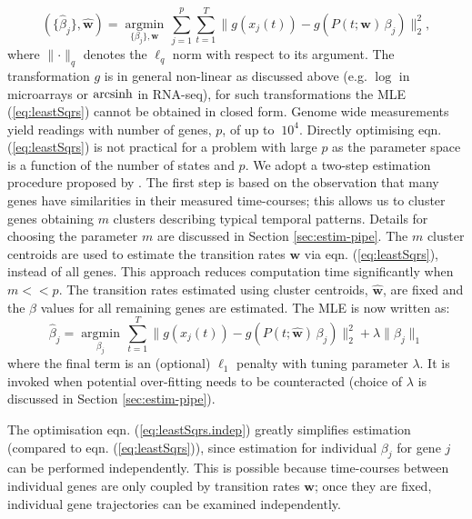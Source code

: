 \begin{equation}
  \label{eq:leastSqrs}
  (\lbrace\hat{\beta}_j\rbrace, \hat{\mathbf{w}}) =  \underset{\lbrace\beta_j\rbrace, \mathbf{w}}{\operatorname{argmin}} \, \sum_{j=1}^p \sum_{t=1}^T \lVert g(x_j(t)) - g\left(P(t; \mathbf{w})\,\beta_j \right) \rVert_2^2,%
\end{equation}
where $\lVert \cdot \rVert_q$ denotes the $\ell_q$ norm with respect to its argument.
The transformation $g$ is in general non-linear as discussed above (e.g. $\log$ in microarrays or $\operatorname{arcsinh}$ in RNA-seq), for such transformations the MLE (\ref{eq:leastSqrs}) cannot be obtained in closed form. Genome wide measurements yield readings with number of genes, $p$, of up to $~10^4$. Directly optimising eqn. (\ref{eq:leastSqrs}) is not practical for a problem with large $p$ as the parameter space is a function of the number of states and $p$. We adopt a two-step estimation procedure proposed by \cite{Armond:2013}. The first step is based on the observation that many genes have similarities in their measured time-courses; this allows us to cluster genes obtaining $m$ clusters describing typical temporal patterns. Details for choosing the parameter $m$ are discussed in Section \ref{sec:estim-pipe}. The $m$ cluster centroids are used to estimate the transition rates $\mathbf{w}$ via eqn. (\ref{eq:leastSqrs}), instead of all genes. This approach reduces computation time significantly when $m << p$.
The transition rates estimated using cluster centroids, $\hat{\mathbf{w}}$, are fixed and the $\beta$ values for all remaining genes are estimated. The MLE is now written as:
\begin{equation}
  \label{eq:leastSqrs.indep}
\hat{\beta}_j  =  \underset{\beta_j}{\operatorname{argmin}} \, \sum_{t=1}^T \lVert g(x_j(t)) - g\left(P(t; \hat{\mathbf{w}})\,\beta_j \right) \rVert_2^2 + \lambda \lVert \beta_j \rVert_1
\end{equation}
where the final term is an (optional) $\ell_1$ penalty with tuning parameter $\lambda$. It is invoked when potential over-fitting needs to be counteracted (choice of $\lambda$ is discussed in Section \ref{sec:estim-pipe}).

The optimisation eqn. (\ref{eq:leastSqrs.indep}) greatly simplifies estimation (compared to  eqn. (\ref{eq:leastSqrs})), since estimation for individual $\beta_j$ for gene $j$ can be performed independently. This is possible because time-courses between individual genes are only coupled by transition rates $\mathbf{w}$; once they are fixed, individual gene trajectories can be examined independently.

